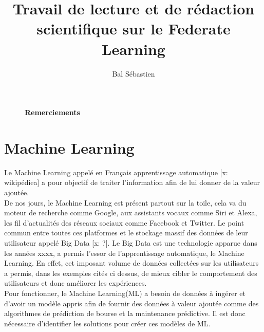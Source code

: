\documentclass[12pt,a4paper]{report}
\begin{document}
\title{\Large{\Large {Travail de lecture et de rédaction scientifique sur le Federate Learning}}}

\author{Bal Sébastien}

\maketitle

\thispagestyle{empty} %

\fancyhead[LE,RO]{\leftmark}

\fancyhead[RE,LO]{}



 


\begin{figure}[p]

\large\textbf{Remerciements}


\end{figure}

\tableofcontents
\thispagestyle{empty} %

\fancyfoot[R]{\thepage}

\chapter{Machine Learning}
\thispagestyle{plain}\setcounter{page}{1} %
Le Machine Learning appelé en Français apprentissage automatique [x: wikipédiea] a pour objectif de traiter l'information afin de lui donner de la valeur ajoutée.\\

De nos jours, le Machine Learning est présent partout sur la toile, cela va du moteur de recherche comme Google, aux assistants vocaux comme Siri et Alexa, les fil d'actualités des réseaux sociaux comme Facebook et Twitter. Le point commun entre toutes ces platformes et le stockage massif des données de leur utilisateur appelé Big Data [x: ?]. Le Big Data est une technologie apparue dans les années xxxx, a permis l'essor de l'apprentissage automatique, le Machine Learning. En effet, cet imposant volume de données collectées sur les utilisateurs a permis, dans les exemples cités ci dessus, de mieux cibler le comportement des utilisateurs et donc améliorer les expériences.\\

Pour fonctionner, le Machine Learning(ML) a besoin de données à ingérer et d'avoir un modèle appris afin de fournir des données à valeur ajoutée comme des algorithmes de prédiction de bourse et la maintenance prédictive. Il est donc nécessaire d'identifier les solutions pour créer ces modèles de ML.\\
\end{document}

